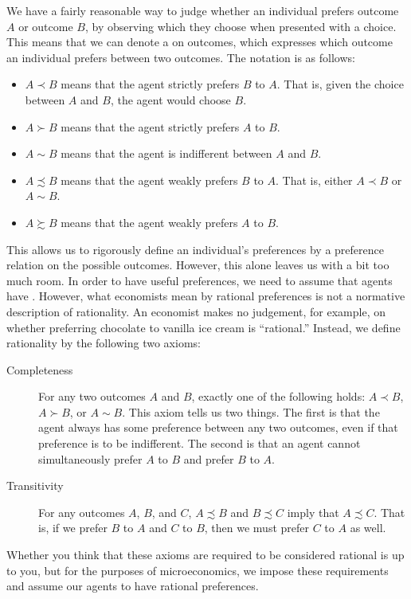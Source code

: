 We have a fairly reasonable way to judge whether an individual prefers outcome $A$ or outcome $B$, by observing which they choose when presented with a choice. This means that we can denote a  on outcomes, which expresses which outcome an individual prefers between two outcomes. The notation is as follows:
\begin{itemize}
    \item $A \prec B$ means that the agent strictly prefers $B$ to $A$. That is, given the choice between $A$ and $B$, the agent would choose $B$.
    \item $A \succ B$ means that the agent strictly prefers $A$ to $B$.
    \item $A \sim B$ means that the agent is indifferent between $A$ and $B$.
    \item $A \precsim B$ means that the agent weakly prefers $B$ to $A$. That is, either $A \prec B$ or $A \sim B$.
    \item $A \succsim B$ means that the agent weakly prefers $A$ to $B$.
\end{itemize}
This allows us to rigorously define an individual's preferences by a preference relation on the possible outcomes. However, this alone leaves us with a bit too much room. In order to have useful preferences, we need to assume that agents have . However, what economists mean by rational preferences is not a normative description of rationality. An economist makes no judgement, for example, on whether preferring chocolate to vanilla ice cream is ``rational.'' Instead, we define rationality by the following two axioms:
\begin{description}
    \item[Completeness] For any two outcomes $A$ and $B$, exactly one of the following holds: $A \prec B$, $A \succ B$, or $A \sim B$. This axiom tells us two things. The first is that the agent always has some preference between any two outcomes, even if that preference is to be indifferent. The second is that an agent cannot simultaneously prefer $A$ to $B$ and prefer $B$ to $A$.
    \item[Transitivity] For any outcomes $A$, $B$, and $C$, $A \precsim B$ and $B \precsim C$ imply that $A \precsim C$. That is, if we prefer $B$ to $A$ and $C$ to $B$, then we must prefer $C$ to $A$ as well.
\end{description}
Whether you think that these axioms are required to be considered rational is up to you, but for the purposes of microeconomics, we impose these requirements and assume our agents to have rational preferences.

